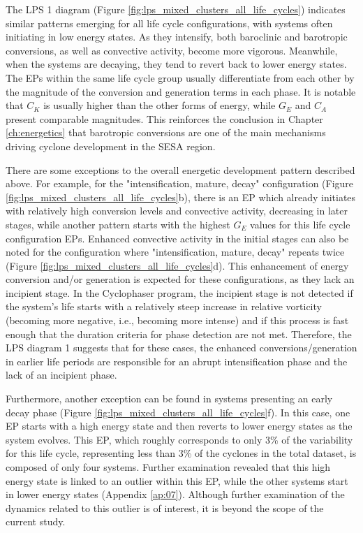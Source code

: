The LPS 1 diagram (Figure \ref{fig:lps_mixed_clusters_all_life_cycles}) indicates similar patterns emerging for all life cycle configurations, with systems often initiating in low energy states. As they intensify, both baroclinic and barotropic conversions, as well as convective activity, become more vigorous. Meanwhile, when the systems are decaying, they tend to revert back to lower energy states. The EPs within the same life cycle group usually differentiate from each other by the magnitude of the conversion and generation terms in each phase. It is notable that $C_K$ is usually higher than the other forms of energy, while $G_E$ and $C_A$ present comparable magnitudes. This reinforces the conclusion in Chapter \ref{ch:energetics} that barotropic conversions are one of the main mechanisms driving cyclone development in the SESA region.

There are some exceptions to the overall energetic development pattern described above. For example, for the "intensification, mature, decay" configuration (Figure \ref{fig:lps_mixed_clusters_all_life_cycles}b), there is an EP which already initiates with relatively high conversion levels and convective activity, decreasing in later stages, while another pattern starts with the highest $G_E$ values for this life cycle configuration EPs. Enhanced convective activity in the initial stages can also be noted for the configuration where "intensification, mature, decay" repeats twice (Figure \ref{fig:lps_mixed_clusters_all_life_cycles}d). This enhancement of energy conversion and/or generation is expected for these configurations, as they lack an incipient stage. In the Cyclophaser program, the incipient stage is not detected if the system's life starts with a relatively steep increase in relative vorticity (becoming more negative, i.e., becoming more intense) and if this process is fast enough that the duration criteria for phase detection are not met. Therefore, the LPS diagram 1 suggests that for these cases, the enhanced conversions/generation in earlier life periods are responsible for an abrupt intensification phase and the lack of an incipient phase.

Furthermore, another exception can be found in systems presenting an early decay phase (Figure \ref{fig:lps_mixed_clusters_all_life_cycles}f). In this case, one EP starts with a high energy state and then reverts to lower energy states as the system evolves. This EP, which roughly corresponds to only 3\% of the variability for this life cycle, representing less than 3\% of the cyclones in the total dataset, is composed of only four systems. Further examination revealed that this high energy state is linked to an outlier within this EP, while the other systems start in lower energy states (Appendix \ref{ap:07}). Although further examination of the dynamics related to this outlier is of interest, it is beyond the scope of the current study.


